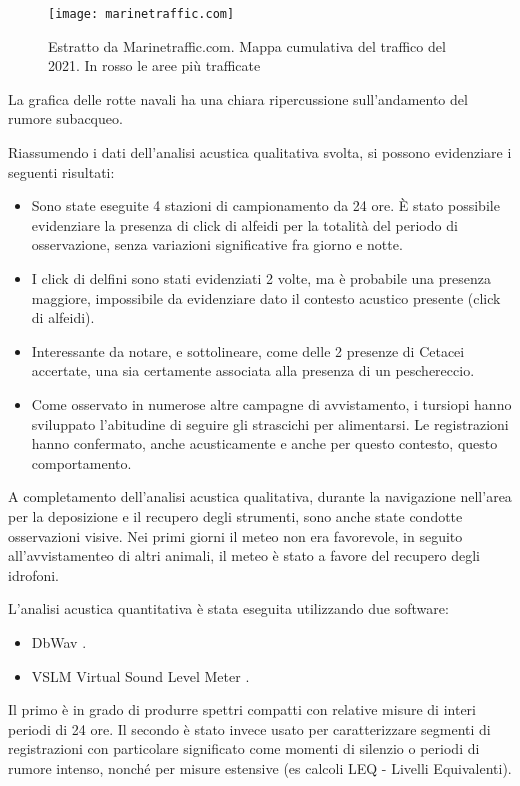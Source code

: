 \begin{figure}[h]
\centering 
\texttt{[image: marinetraffic.com]}
\caption{Estratto da Marinetraffic.com. Mappa cumulativa del traffico del 2021. In rosso le aree più trafficate}
\end{figure} 

La grafica delle rotte navali ha una chiara ripercussione sull’andamento del rumore subacqueo.
 
Riassumendo i dati dell’analisi acustica qualitativa svolta, si possono evidenziare i seguenti risultati: 
\begin{itemize} 
\item Sono state eseguite 4 stazioni di campionamento da 24 ore. È stato possibile evidenziare la presenza di click di alfeidi per la totalità del periodo di osservazione, senza variazioni significative fra giorno e notte. 
\item I click di delfini sono stati evidenziati 2 volte, ma è probabile una presenza maggiore, impossibile da evidenziare dato il contesto acustico presente (click di alfeidi). 
\item Interessante da notare, e sottolineare, come delle 2 presenze di Cetacei accertate, una sia certamente associata alla presenza di un peschereccio. 
\item Come osservato in numerose altre campagne di avvistamento, i tursiopi hanno sviluppato l’abitudine di seguire gli strascichi per alimentarsi. 
Le registrazioni hanno confermato, anche acusticamente e anche per questo contesto, questo comportamento. 
\end{itemize} 

A completamento dell’analisi acustica qualitativa, durante la navigazione nell’area per la deposizione e il recupero degli strumenti, sono anche state condotte osservazioni visive. 
Nei primi giorni il meteo non era favorevole, in seguito all'avvistamenteo di altri animali, il meteo è stato a favore del recupero degli idrofoni. 

L'analisi acustica quantitativa è stata eseguita utilizzando due software: 
\begin{itemize}
\item DbWav \href {https://au.marshallday.com/innovation/software/dbwav/}{\DbWav}.
\item VSLM Virtual Sound Level Meter \href {https://doi.org/10.1121/1.5036041}{\VSLM}. 
\end{itemize} 

Il primo è in grado di produrre spettri compatti con relative misure di interi periodi di 24 ore.
Il secondo è stato invece usato per caratterizzare segmenti di registrazioni con particolare significato come momenti di silenzio o periodi di rumore intenso, nonché per misure estensive (es calcoli LEQ - Livelli Equivalenti).

